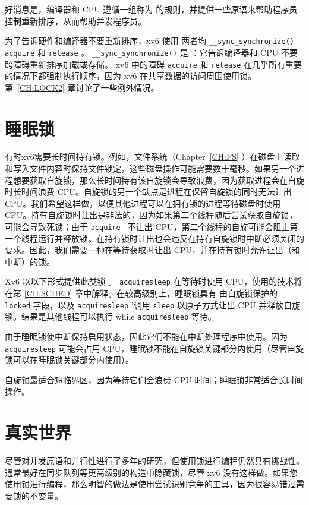 好消息是，编译器和 CPU 遵循一组称为        的规则，并提供一些原语来帮助程序员控制重新排序，从而帮助并发程序员。  

为了告诉硬件和编译器不要重新排序，xv6 使用
 两者均    \lstinline{__sync_synchronize()}   
    \lstinline{acquire}           和
    \lstinline{release}           。
    \lstinline{__sync_synchronize()}    是        ：它告诉编译器和 CPU 不要跨障碍重新排序加载或存储。 xv6 中的障碍
    \lstinline{acquire}    和
    \lstinline{release}    在几乎所有重要的情况下都强制执行顺序，因为 xv6 在共享数据的访问周围使用锁。第~\ref{CH:LOCK2}    章讨论了一些例外情况。
    \section{睡眠锁  }     

有时xv6需要长时间持有锁。例如，文件系统（Chapter~\ref{CH:FS}   ）在磁盘上读取和写入文件内容时保持文件锁定，这些磁盘操作可能需要数十毫秒。如果另一个进程想要获取自旋锁，那么长时间持有该自旋锁会导致浪费，因为获取进程会在自旋时长时间浪费 CPU。自旋锁的另一个缺点是进程在保留自旋锁的同时无法让出 CPU。我们希望这样做，以便其他进程可以在拥有锁的进程等待磁盘时使用 CPU。持有自旋锁时让出是非法的，因为如果第二个线程随后尝试获取自旋锁，可能会导致死锁；由于  {    \tt    acquire   }  不让出 CPU，第二个线程的自旋可能会阻止第一个线程运行并释放锁。在持有锁时让出也会违反在持有自旋锁时中断必须关闭的要求。因此，我们需要一种在等待获取时让出 CPU，并在持有锁时允许让出（和中断）的锁。  

Xv6 以以下形式提供此类锁
        。
    \lstinline{acquiresleep}   
        在等待时使用 CPU，使用的技术将在第    \ref{CH:SCHED}    章中解释。在较高级别上，睡眠锁具有
 由自旋锁保护的    \lstinline{locked}    字段，以及
    \lstinline{acquiresleep}    '调用
    \lstinline{sleep}    以原子方式让出 CPU 并释放自旋锁。结果是其他线程可以执行 while
    \lstinline{acquiresleep}    等待。  

由于睡眠锁使中断保持启用状态，因此它们不能在中断处理程序中使用。因为
    \lstinline{acquiresleep}    可能会占用 CPU，睡眠锁不能在自旋锁关键部分内使用（尽管自旋锁可以在睡眠锁关键部分内使用）。  

自旋锁最适合短临界区，因为等待它们会浪费 CPU 时间；睡眠锁非常适合长时间操作。
    \section{真实世界  }    尽管对并发原语和并行性进行了多年的研究，但使用锁进行编程仍然具有挑战性。通常最好在同步队列等更高级别的构造中隐藏锁，尽管 xv6 没有这样做。如果您使用锁进行编程，那么明智的做法是使用尝试识别竞争的工具，因为很容易错过需要锁的不变量。  

